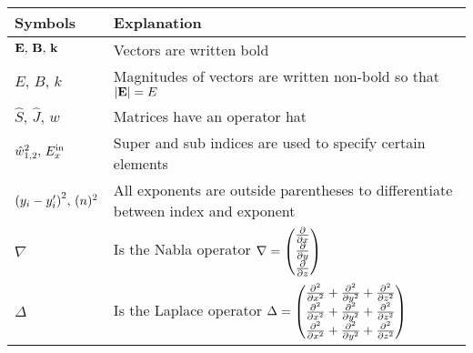 \begingroup
\renewcommand{\arraystretch}{1.5}
\begin{tabular}{m{4cm} l}
Symbols & Explanation \\
\midrule
$\vb E, \, \vb B, \, \vb k$ & Vectors are written bold \\
$E, \, B, \, k $ &
Magnitudes of vectors are written non-bold so that $\qty|\vb E| = E$ \\
$\hat S, \, \hat J, \, \hat w$ & Matrices have an operator hat \\
$\hat w^2_{1,2}, \, E^{\mathrm{in}}_x$ & Super and sub indices are used to specify certain elements \\
$\qty(y_i - y_i')^2, \, (n)^2$ & All exponents are outside parentheses to differentiate between index and exponent \\
$\nabla$ & Is the Nabla operator
$\nabla
= \begin{pmatrix}
    \pdv x \\
    \pdv y \\
    \pdv z
\end{pmatrix}$ \\
$\Delta$ & Is the Laplace operator $\Delta =
\begin{pmatrix}
    \pdv[2] x + \pdv[2] y + \pdv[2] z \\
    \pdv[2] x + \pdv[2] y + \pdv[2] z \\
    \pdv[2] x + \pdv[2] y + \pdv[2] z 
\end{pmatrix}$
\end{tabular}
\endgroup
